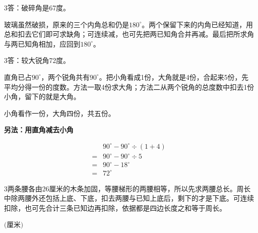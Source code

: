 \documentclass[multi=snippet,border={5bp 20bp 5bp 5bp}]{standalone}
\newenvironment{snippet}[3]{\begin{minipage}{#1bp}\color{answerred}\fontsize{#2}{#3}\selectfont\raggedright}{\end{minipage}}
\begin{document}
\begin{snippet}{505}{11.5}{14}\begin{multicols}{3}\raggedcolumns 答：破碎角是67度。\par 玻璃虽然破损，原来的三个内角总和仍是\(180^\circ\)\allowbreak 。两个保留下来的内角已经知道，用总和扣去它们即可求缺角；可连续减，也可先把两已知角合并再减。最后把所求角与两已知角相加，应回到\(180^\circ\)\allowbreak 。\end{multicols}\end{snippet}
\begin{snippet}{505}{11.5}{14}\begin{multicols}{3}\raggedcolumns 答：较大锐角72度。\par 直角已占\(90^\circ\)\allowbreak ，两个锐角共有\(90^\circ\)\allowbreak 。把小角看成1份，大角就是4份，合起来5份，先平均分得一份的度数。方法一取4份求大角；方法二从两个锐角的总度数中扣去1份小角，留下的就是大角。\par 小角看作一份，大角四份，共五份。\par \textbf{另法：用直角减去小角}\par \[\begin{aligned}&90^\circ-90^\circ\div(1+4)\\={}&90^\circ-90^\circ\div5\\={}&90^\circ-18^\circ\\={}&72^\circ\end{aligned}\]\end{multicols}\end{snippet}
\begin{snippet}{505}{11.5}{14}\begin{multicols}{3}\raggedcolumns 两条腰各由26厘米的木条加固，等腰梯形的两腰相等，所以先求两腰总长。周长中除两腰外还包括上底、下底，扣去两腰与已知上底后，剩下的才是下底。可连续扣除，也可先合计三条已知边再扣除，依据都是四边长度之和等于周长。\end{multicols}\end{snippet}
\begin{snippet}{80}{10.0}{14}\SourceSans\setlength{\mathindent}{2bp}\(\text{(厘米)}\)\end{snippet}
\end{document}
